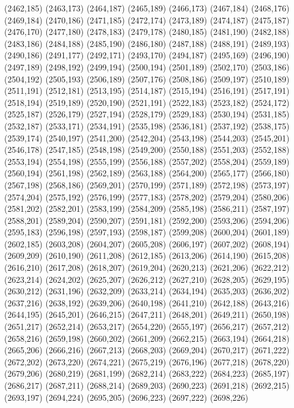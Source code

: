 (2462,185)
(2463,173)
(2464,187)
(2465,189)
(2466,173)
(2467,184)
(2468,176)
(2469,184)
(2470,186)
(2471,185)
(2472,174)
(2473,189)
(2474,187)
(2475,187)
(2476,170)
(2477,180)
(2478,183)
(2479,178)
(2480,185)
(2481,190)
(2482,188)
(2483,186)
(2484,188)
(2485,190)
(2486,180)
(2487,188)
(2488,191)
(2489,193)
(2490,186)
(2491,177)
(2492,171)
(2493,170)
(2494,187)
(2495,169)
(2496,190)
(2497,189)
(2498,192)
(2499,194)
(2500,194)
(2501,189)
(2502,170)
(2503,186)
(2504,192)
(2505,193)
(2506,189)
(2507,176)
(2508,186)
(2509,197)
(2510,189)
(2511,191)
(2512,181)
(2513,195)
(2514,187)
(2515,194)
(2516,191)
(2517,191)
(2518,194)
(2519,189)
(2520,190)
(2521,191)
(2522,183)
(2523,182)
(2524,172)
(2525,187)
(2526,179)
(2527,194)
(2528,179)
(2529,183)
(2530,194)
(2531,185)
(2532,187)
(2533,171)
(2534,191)
(2535,198)
(2536,181)
(2537,192)
(2538,175)
(2539,174)
(2540,197)
(2541,200)
(2542,204)
(2543,198)
(2544,203)
(2545,201)
(2546,178)
(2547,185)
(2548,198)
(2549,200)
(2550,188)
(2551,203)
(2552,188)
(2553,194)
(2554,198)
(2555,199)
(2556,188)
(2557,202)
(2558,204)
(2559,189)
(2560,194)
(2561,198)
(2562,189)
(2563,188)
(2564,200)
(2565,177)
(2566,180)
(2567,198)
(2568,186)
(2569,201)
(2570,199)
(2571,189)
(2572,198)
(2573,197)
(2574,204)
(2575,192)
(2576,199)
(2577,183)
(2578,202)
(2579,204)
(2580,206)
(2581,202)
(2582,201)
(2583,199)
(2584,209)
(2585,198)
(2586,211)
(2587,197)
(2588,201)
(2589,204)
(2590,207)
(2591,181)
(2592,200)
(2593,206)
(2594,206)
(2595,183)
(2596,198)
(2597,193)
(2598,187)
(2599,208)
(2600,204)
(2601,189)
(2602,185)
(2603,208)
(2604,207)
(2605,208)
(2606,197)
(2607,202)
(2608,194)
(2609,209)
(2610,190)
(2611,208)
(2612,185)
(2613,206)
(2614,190)
(2615,208)
(2616,210)
(2617,208)
(2618,207)
(2619,204)
(2620,213)
(2621,206)
(2622,212)
(2623,214)
(2624,202)
(2625,207)
(2626,212)
(2627,210)
(2628,205)
(2629,195)
(2630,212)
(2631,196)
(2632,209)
(2633,214)
(2634,194)
(2635,203)
(2636,202)
(2637,216)
(2638,192)
(2639,206)
(2640,198)
(2641,210)
(2642,188)
(2643,216)
(2644,195)
(2645,201)
(2646,215)
(2647,211)
(2648,201)
(2649,211)
(2650,198)
(2651,217)
(2652,214)
(2653,217)
(2654,220)
(2655,197)
(2656,217)
(2657,212)
(2658,216)
(2659,198)
(2660,202)
(2661,209)
(2662,215)
(2663,194)
(2664,218)
(2665,206)
(2666,216)
(2667,213)
(2668,203)
(2669,204)
(2670,217)
(2671,222)
(2672,202)
(2673,220)
(2674,221)
(2675,219)
(2676,196)
(2677,218)
(2678,220)
(2679,206)
(2680,219)
(2681,199)
(2682,214)
(2683,222)
(2684,223)
(2685,197)
(2686,217)
(2687,211)
(2688,214)
(2689,203)
(2690,223)
(2691,218)
(2692,215)
(2693,197)
(2694,224)
(2695,205)
(2696,223)
(2697,222)
(2698,226)
